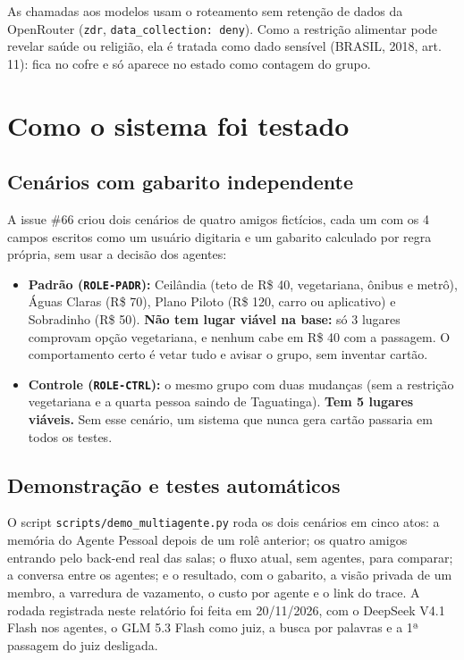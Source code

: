 \documentclass[12pt,a4paper]{article}
\begin{document}
As chamadas aos modelos usam o roteamento sem retenção de dados da OpenRouter (\texttt{zdr}, \texttt{data\_\allowbreak{}collection: deny}). Como a restrição alimentar pode revelar saúde ou religião, ela é tratada como dado sensível (BRASIL, 2018, art. 11): fica no cofre e só aparece no estado como contagem do grupo.


\section{Como o sistema foi testado}
\subsection{Cenários com gabarito independente}
A issue \#66 criou dois cenários de quatro amigos fictícios, cada um com os 4 campos escritos como um usuário digitaria e um gabarito calculado por regra própria, sem usar a decisão dos agentes:

\begin{itemize}
\item \textbf{Padrão (\texttt{ROLE-PADR}):} Ceilândia (teto de R\$ 40, vegetariana, ônibus e metrô), Águas Claras (R\$ 70), Plano Piloto (R\$ 120, carro ou aplicativo) e Sobradinho (R\$ 50). \textbf{Não tem lugar viável na base:} só 3 lugares comprovam opção vegetariana, e nenhum cabe em R\$ 40 com a passagem. O comportamento certo é vetar tudo e avisar o grupo, sem inventar cartão.
\item \textbf{Controle (\texttt{ROLE-CTRL}):} o mesmo grupo com duas mudanças (sem a restrição vegetariana e a quarta pessoa saindo de Taguatinga). \textbf{Tem 5 lugares viáveis.} Sem esse cenário, um sistema que nunca gera cartão passaria em todos os testes.
\end{itemize}

\subsection{Demonstração e testes automáticos}
O script \texttt{scripts/demo\_\allowbreak{}multiagente.py} roda os dois cenários em cinco atos: a memória do Agente Pessoal depois de um rolê anterior; os quatro amigos entrando pelo back-end real das salas; o fluxo atual, sem agentes, para comparar; a conversa entre os agentes; e o resultado, com o gabarito, a visão privada de um membro, a varredura de vazamento, o custo por agente e o link do trace. A rodada registrada neste relatório foi feita em 20/11/2026, com o DeepSeek V4.1 Flash nos agentes, o GLM 5.3 Flash como juiz, a busca por palavras e a 1ª passagem do juiz desligada.
\end{document}
